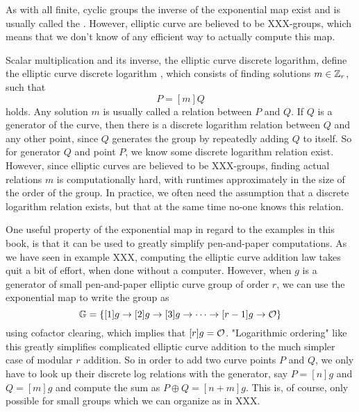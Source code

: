 As with all finite, cyclic groups the inverse of the exponential map exist and is usually called the . However, elliptic curve are believed to be XXX-groups, which means that we don't know of any efficient way to actually compute this map.

Scalar multiplication and its inverse, the elliptic curve discrete logarithm, define the elliptic curve discrete logarithm , which consists of finding solutions $m\in\mathbb{Z}_r$, such that
\begin{equation}
P = [m]Q
\end{equation}
holds. Any solution $m$ is usually called a  relation between $P$ and $Q$. If $Q$ is a generator of the curve, then there is a discrete logarithm relation between $Q$ and any other point, since $Q$ generates the group by repeatedly adding $Q$ to itself. So for generator $Q$ and point $P$, we know some discrete logarithm relation exist. However, since elliptic curves are believed to be XXX-groups, finding actual relations $m$ is computationally hard, with runtimes approximately in the size of the order of the group. In practice, we often need the assumption that a discrete logarithm relation exists, but that at the same time no-one knows this relation.

One useful property of the exponential map in regard to the examples in this book, is that it can be used to greatly simplify pen-and-paper computations. As we have seen in example XXX, computing the elliptic curve addition law takes quit a bit of effort, when done without a computer. However, when $g$ is a generator of small pen-and-paper elliptic curve group of order $r$, we can use the exponential map to write the group as
\begin{equation}
\mathbb{G} = \{[1]g\to [2]g \to [3]g\to\cdots\to [r-1]g\to \mathcal{O}\}
\end{equation} 
using cofactor clearing, which implies that $[r]g=\mathcal{O}$. "Logarithmic ordering" like this greatly simplifies complicated elliptic curve addition to the much simpler case of modular $r$ addition. So in order to add two curve points $P$ and $Q$, we only have to look up their discrete log relations with the generator, say $P=[n]g$ and $Q=[m]g$ and compute the sum as $P\oplus Q = [n+m]g$. This is, of course, only possible for small groups which we can organize as in XXX.

